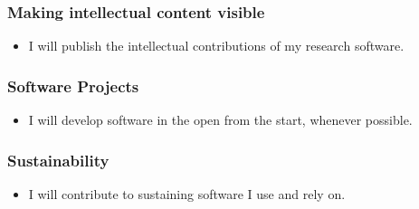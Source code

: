 \documentclass[a4paper,UKenglish]{dagman}
\renewcommand{\paragraph}[1]{\subsubsection*{#1}\xspace}
\begin{document}
\paragraph{Making intellectual content visible}
\begin{itemize}
\item I will publish the intellectual contributions of my research software.
\end{itemize}

\paragraph{Software Projects}
\begin{itemize}
\item I will develop software in the open from the start, whenever possible.
\end{itemize}

\paragraph{Sustainability}
\begin{itemize}
\item I will contribute to sustaining software I use and rely on. 
\end{itemize}
\end{document}
